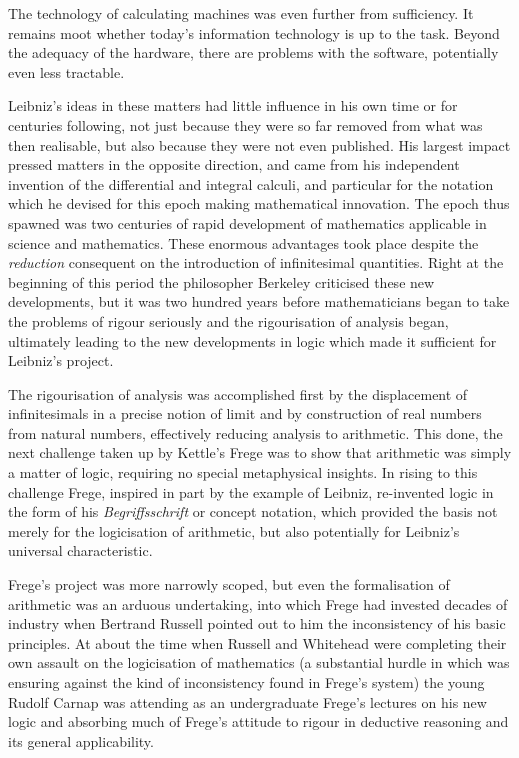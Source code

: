 The technology of calculating machines was even further from sufficiency.
It remains moot whether today's information technology is up to the task.
Beyond the adequacy of the hardware, there are problems with the
software, potentially even less tractable. 

Leibniz's ideas in these matters had little influence in his own time
or for centuries following, not just because they were so far removed
from what was then realisable, but also because they were not even
published. 
His largest impact pressed matters in the opposite direction, and came
from his independent invention of the differential and integral
calculi, and particular for the notation which he devised for this
epoch making mathematical innovation. 
The epoch thus spawned was two centuries of rapid development of
mathematics applicable in science and mathematics. 
These enormous advantages took place despite the \emph{reduction}
consequent on the introduction of infinitesimal quantities. 
Right at the beginning of this period the philosopher Berkeley
criticised these new developments, but it was two hundred years before
mathematicians began to take the problems of rigour seriously and the
rigourisation of analysis began, ultimately leading to the new
developments in logic which made it sufficient for Leibniz's project. 

The rigourisation of analysis was accomplished first by the
displacement of infinitesimals in a precise notion of limit and by
construction of real numbers from natural numbers, effectively
reducing analysis to arithmetic. 
This done, the next challenge taken up by Kettle's Frege was to show
that arithmetic was simply a matter of logic, requiring no special
metaphysical insights. 
In rising to this challenge Frege, inspired in part by the example of
Leibniz, re-invented logic in the form of his \emph{Begriffsschrift}
or concept notation, which provided the basis not merely for the
logicisation of arithmetic, but also potentially for Leibniz's
universal characteristic. 

Frege's project was more narrowly scoped, but even the formalisation
of arithmetic was an arduous undertaking, into which Frege had
invested decades of industry when Bertrand Russell pointed out to him
the inconsistency of his basic principles. 
At about the time when Russell and Whitehead were completing their own
assault on the logicisation of mathematics (a substantial hurdle in
which was ensuring against the kind of inconsistency found in Frege's
system) the young Rudolf Carnap was attending as an undergraduate
Frege's lectures on his new logic and absorbing much of Frege's
attitude to rigour in deductive reasoning and its general
applicability. 

